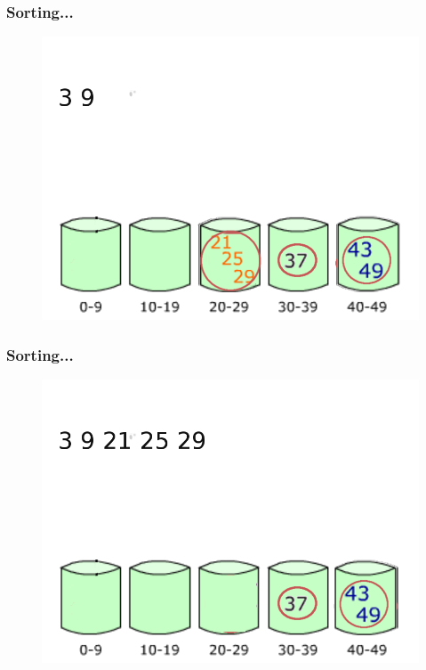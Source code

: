 \documentclass[pdf]{beamer}
\begin{document}
\begin{frame}
	\frametitle{Sorting...}
	\begin{figure}
		\includegraphics[scale=.3]{Figure/18.png}
	\end{figure}	
\end{frame}
\begin{frame}
	\frametitle{Sorting...}
	\begin{figure}
		\includegraphics[scale=.3]{Figure/19.png}
	\end{figure}	
\end{frame}
\end{document}
